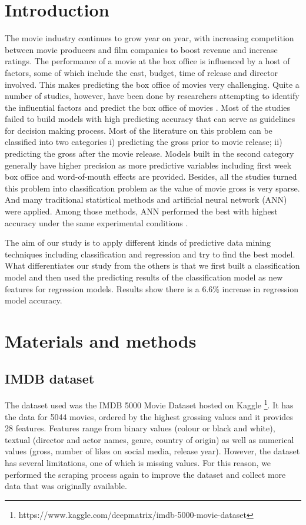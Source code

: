 \section{Introduction}
The movie industry continues to grow year on year, with increasing competition between movie producers and film companies to boost revenue and increase ratings. The performance of a movie at the box office is influenced by a host of factors, some of which include the cast, budget, time of release and director involved. This makes predicting the box office of movies very challenging. Quite a number of studies, however, have been done by researchers attempting to identify the influential factors and predict the box office of movies \cite{sharda2006predicting}. Most of the studies failed to build models with high predicting accuracy that can serve as guidelines for decision making process. Most of the literature on this problem can be classified into two categories i) predicting the gross prior to movie release; ii) predicting the gross after the movie release. Models built in the second category generally have higher precision as more predictive variables including first week box office and word-of-mouth effects are provided. Besides, all the studies turned this problem into classification problem as the value of movie gross is very sparse.  And many traditional statistical methods and artificial neural network (ANN) were applied. Among those methods, ANN performed the best with highest accuracy under the same experimental conditions \cite{sharda2006predicting}.
 
The aim of our study is to apply different kinds of predictive data mining techniques including classification and regression and try to find the best model. What differentiates our study from the others is that we first built a classification model and then used the predicting results of the classification model as new features for regression models. Results show there is a 6.6\% increase in regression model accuracy.

\section{Materials and methods}

\subsection{IMDB dataset}
The dataset used was the IMDB 5000 Movie Dataset hosted on Kaggle \footnote{https://www.kaggle.com/deepmatrix/imdb-5000-movie-dataset}. It has the data for 5044 movies, ordered by the highest grossing values and it provides 28 features. Features range from binary values (colour or black and white), textual (director and actor names, genre, country of origin) as well as numerical values (gross, number of likes on social media, release year).  However, the dataset has several limitations, one of which is missing values. For this reason, we performed the scraping process again to improve the dataset and collect more data that was originally available.

